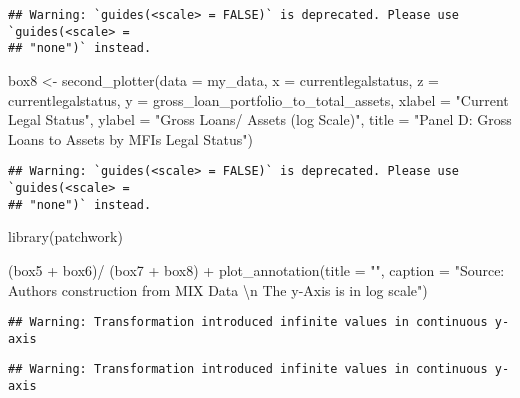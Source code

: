 \documentclass[a4paper,nobind]{templates/ociamthesis}
\newenvironment{Shaded}{\begin{snugshade}}{\end{snugshade}}
\newcommand{\AttributeTok}[1]{\textcolor[rgb]{0.77,0.63,0.00}{#1}}
\newcommand{\FunctionTok}[1]{\textcolor[rgb]{0.00,0.00,0.00}{#1}}
\newcommand{\NormalTok}[1]{#1}
\newcommand{\OtherTok}[1]{\textcolor[rgb]{0.56,0.35,0.01}{#1}}
\newcommand{\SpecialCharTok}[1]{\textcolor[rgb]{0.00,0.00,0.00}{#1}}
\newcommand{\StringTok}[1]{\textcolor[rgb]{0.31,0.60,0.02}{#1}}
\renewenvironment{Shaded}
{
  \vspace{10pt}%
  \begin{snugshade}%
}{%
  \end{snugshade}%
  \vspace{8pt}%
}
\begin{document}
\begin{landscape}
\begin{verbatim}
## Warning: `guides(<scale> = FALSE)` is deprecated. Please use `guides(<scale> =
## "none")` instead.
\end{verbatim}

\begin{Shaded}
\begin{Highlighting}[]
\NormalTok{box8 }\OtherTok{\textless{}{-}} \FunctionTok{second\_plotter}\NormalTok{(}\AttributeTok{data =}\NormalTok{ my\_data, }\AttributeTok{x =}\NormalTok{ currentlegalstatus, }
        \AttributeTok{z =}\NormalTok{ currentlegalstatus,}
        \AttributeTok{y =}\NormalTok{ gross\_loan\_portfolio\_to\_total\_assets, }
        \AttributeTok{xlabel =} \StringTok{"Current Legal Status"}\NormalTok{, }
        \AttributeTok{ylabel =} \StringTok{"Gross Loans/ Assets (log Scale)"}\NormalTok{, }
        \AttributeTok{title =} \StringTok{"Panel D: Gross Loans to Assets by MFIs Legal Status"}\NormalTok{)}
\end{Highlighting}
\end{Shaded}

\begin{verbatim}
## Warning: `guides(<scale> = FALSE)` is deprecated. Please use `guides(<scale> =
## "none")` instead.
\end{verbatim}

\begin{Shaded}
\begin{Highlighting}[]
\FunctionTok{library}\NormalTok{(patchwork)}

\NormalTok{(box5 }\SpecialCharTok{+}\NormalTok{ box6)}\SpecialCharTok{/}\NormalTok{ (box7 }\SpecialCharTok{+}\NormalTok{ box8) }\SpecialCharTok{+} \FunctionTok{plot\_annotation}\NormalTok{(}\AttributeTok{title =} \StringTok{""}\NormalTok{, }\AttributeTok{caption =} \StringTok{"Source: Authors\textquotesingle{} construction from MIX Data }\SpecialCharTok{\textbackslash{}n}
\StringTok{                                                The y{-}Axis is in log scale"}\NormalTok{)}
\end{Highlighting}
\end{Shaded}

\begin{verbatim}
## Warning: Transformation introduced infinite values in continuous y-axis
\end{verbatim}

\begin{verbatim}
## Warning: Transformation introduced infinite values in continuous y-axis


\end{verbatim}
\end{landscape}
\end{document}
